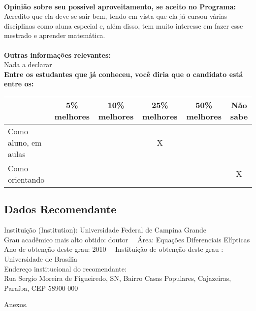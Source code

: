 \documentclass[11pt]{article}
\begin{document}
\\
\textbf{Opinião sobre seu possível aproveitamento, se aceito no Programa:}
\\Acredito que ela deve se sair bem, tendo em vista que ela já cursou várias disciplinas como aluna especial e, além disso, tem muito interesse em fazer  esse mestrado e aprender matemática.\\ 
\\
\textbf{Outras informações relevantes:} \\Nada a declarar
\\[0.3cm]
\textbf{Entre os estudantes que já conheceu, você diria que o candidato está entre os:}
\\
\begin{tabular}{|l|c|c|c|c|c|}
\hline
 & 5\% melhores & 10\% melhores & 25\% melhores & 50\% melhores & Não sabe \\
\hline
Como aluno, em aulas &  &  & X &  & \\
\hline
Como orientando &  &  &  &  & X\\
\hline
\end{tabular}
\subsection*{Dados Recomendante} 
	Instituição (Institution): Universidade Federal de Campina Grande
\\ 
	Grau acadêmico mais alto obtido: doutor
	\ \ Área: Equações Diferenciais Elípticas
	\\
	Ano de obtenção deste grau: 2010
	\ \ 
	Instituição de obtenção deste grau : Universidade de Brasília
	\\ 
	Endereço institucional do recomendante: \\ Rua Sergio Moreira de Figueiredo, SN, Bairro Casas Populares, Cajazeiras, Paraíba, CEP 58900 000 
\begin{center}
Anexos.
\end{center}
\end{document}
